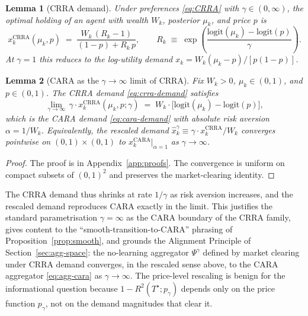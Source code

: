 \documentclass[12pt,letterpaper]{article}
\newtheorem{lemma}{Lemma}
\theoremstyle{definition}
\theoremstyle{remark}
\newcommand{\logit}{\mathrm{logit}}
\newcommand{\Tstar}{T^{\!\star}}
\newcommand{\1}{\mathbf{1}}
\begin{document}
\begin{lemma}[CRRA demand]\label{lem:crra-demand}
Under preferences \eqref{eq:CRRA} with $\gamma\in(0,\infty)$, the optimal
holding of an agent with wealth $W_{k}$, posterior $\mu_{k}$, and price $p$ is
\begin{equation}
   x_{k}^{\mathrm{CRRA}}(\mu_{k},p) \;=\;
   \frac{W_{k}\,(R_{k}-1)}{(1-p)+R_{k}\,p}, \qquad
   R_{k} \;\equiv\; \exp\!\left(\frac{\logit(\mu_{k})-\logit(p)}{\gamma}\right).
\label{eq:crra-demand}
\end{equation}
At $\gamma=1$ this reduces to the log-utility demand
$x_{k} = W_{k}(\mu_{k}-p)/[p(1-p)]$.
\end{lemma}

\begin{lemma}[CARA as the $\gamma\to\infty$ limit of CRRA]\label{lem:cara-limit}
Fix $W_{k}>0$, $\mu_{k}\in(0,1)$, and $p\in(0,1)$. The CRRA demand
\eqref{eq:crra-demand} satisfies
\begin{equation}
   \lim_{\gamma\to\infty}\,\gamma\cdot x_{k}^{\mathrm{CRRA}}(\mu_{k},p;\gamma)
   \;=\; W_{k}\cdot\bigl[\logit(\mu_{k})-\logit(p)\bigr],
\label{eq:cara-as-crra-limit}
\end{equation}
which is the CARA demand \eqref{eq:cara-demand} with absolute risk
aversion $\alpha=1/W_{k}$. Equivalently, the rescaled demand
$\hat x_{k}^{\gamma}\equiv\gamma\cdot x_{k}^{\mathrm{CRRA}}/W_{k}$ converges
pointwise on $(0,1)\times(0,1)$ to $x_{k}^{\mathrm{CARA}}|_{\alpha=1}$ as
$\gamma\to\infty$.
\end{lemma}

\begin{proof}
The proof is in Appendix~\ref{app:proofs}. The convergence is uniform
on compact subsets of $(0,1)^{2}$ and preserves the market-clearing
identity.
\end{proof}

The CRRA demand thus shrinks at rate $1/\gamma$ as risk aversion
increases, and the rescaled demand reproduces CARA exactly in the limit.
This justifies the standard parametrisation $\gamma=\infty$ as the CARA
boundary of the CRRA family, gives content to the
``smooth-transition-to-CARA'' phrasing of
Proposition~\ref{prop:smooth}, and grounds the Alignment Principle of
Section~\ref{sec:agg-space}: the no-learning aggregator $\Psi^{\gamma}$
defined by market clearing under CRRA demand converges, in the rescaled
sense above, to the CARA aggregator \eqref{eq:agg-cara} as
$\gamma\to\infty$. The price-level rescaling is benign for the
informational question because $1-R^{2}(\Tstar;p_{\gamma})$ depends only
on the price function $p_{\gamma}$, not on the demand magnitudes that
clear it.
\end{document}

